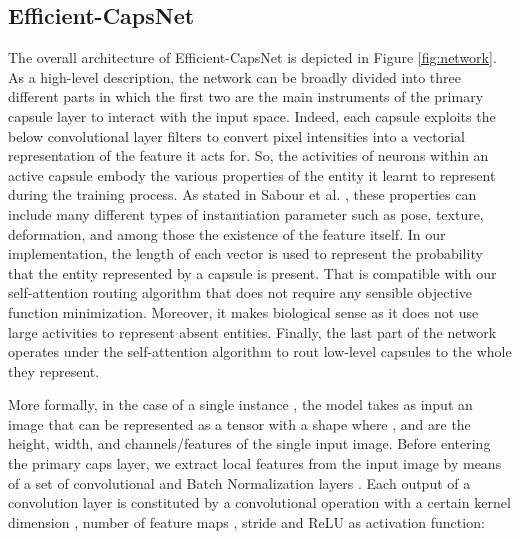 \documentclass{article}
\begin{document}
\subsection{Efficient-CapsNet}
The overall architecture of Efficient-CapsNet is depicted in Figure \ref{fig:network}. As a high-level description, the network can be broadly divided into three different parts in which the first two are the main instruments of the primary capsule layer to interact with the input space. Indeed, each capsule exploits the below convolutional layer filters to convert pixel intensities into a vectorial representation of the feature it acts for. So, the activities of neurons within an active capsule embody the various properties of the entity it learnt to represent during the training process. As stated in Sabour et al. \cite{sabour2017dynamic}, these properties can include many different types of instantiation parameter such as pose, texture, deformation, and among those the existence of the feature itself. In our implementation, the length of each vector is used to represent the probability that the entity represented by a capsule is present. That is compatible with our self-attention routing algorithm that does not require any sensible objective function minimization. Moreover, it makes biological sense as it does not use large activities to represent absent entities. Finally, the last part of the network operates under the self-attention algorithm to rout low-level capsules to the whole they represent. 

More formally, in the case of a single instance , the model takes as input an image that can be represented as a tensor  with a shape  where ,  and  are the height, width, and channels/features of the single input image. Before entering the primary caps layer, we extract local features from the input image  by means of a set of convolutional and Batch Normalization layers \cite{ioffe2015batch}. Each output of a convolution layer  is constituted by a convolutional operation with a certain kernel dimension , number of feature maps , stride  and ReLU as activation function:
\begin{ceqn}

\end{ceqn}
\end{document}
